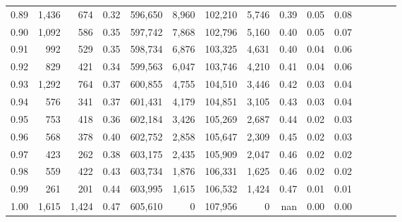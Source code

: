 \begin{tabular}{rrrcrrrrrrrrrrr}
0.89 &   1,436 &    674 &                                       0.32 &  596,650 &    8,960 &  102,210 &    5,746 &  0.39 &  0.05 &                         0.08 \\
0.90 &   1,092 &    586 &                                       0.35 &  597,742 &    7,868 &  102,796 &    5,160 &  0.40 &  0.05 &                         0.07 \\
0.91 &     992 &    529 &                                       0.35 &  598,734 &    6,876 &  103,325 &    4,631 &  0.40 &  0.04 &                         0.06 \\
0.92 &     829 &    421 &                                       0.34 &  599,563 &    6,047 &  103,746 &    4,210 &  0.41 &  0.04 &                         0.06 \\
0.93 &   1,292 &    764 &                                       0.37 &  600,855 &    4,755 &  104,510 &    3,446 &  0.42 &  0.03 &                         0.04 \\
0.94 &     576 &    341 &                                       0.37 &  601,431 &    4,179 &  104,851 &    3,105 &  0.43 &  0.03 &                         0.04 \\
0.95 &     753 &    418 &                                       0.36 &  602,184 &    3,426 &  105,269 &    2,687 &  0.44 &  0.02 &                         0.03 \\
0.96 &     568 &    378 &                                       0.40 &  602,752 &    2,858 &  105,647 &    2,309 &  0.45 &  0.02 &                         0.03 \\
0.97 &     423 &    262 &                                       0.38 &  603,175 &    2,435 &  105,909 &    2,047 &  0.46 &  0.02 &                         0.02 \\
0.98 &     559 &    422 &                                       0.43 &  603,734 &    1,876 &  106,331 &    1,625 &  0.46 &  0.02 &                         0.02 \\
0.99 &     261 &    201 &                                       0.44 &  603,995 &    1,615 &  106,532 &    1,424 &  0.47 &  0.01 &                         0.01 \\
1.00 &   1,615 &  1,424 &                                       0.47 &  605,610 &        0 &  107,956 &        0 &   nan &  0.00 &                         0.00 \\
\bottomrule
\end{tabular}
